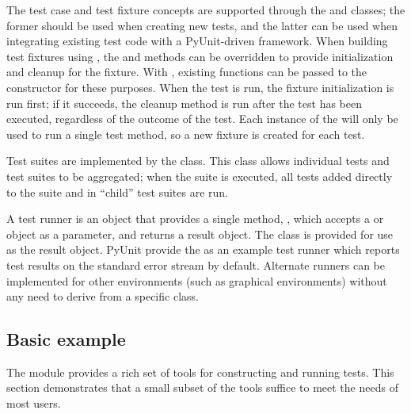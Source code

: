 The test case and test fixture concepts are supported through the
 and  classes; the former
should be used when creating new tests, and the latter can be used when
integrating existing test code with a PyUnit-driven framework.  When
building test fixtures using , the 
and  methods can be overridden to provide
initialization and cleanup for the fixture.  With
, existing functions can be passed to the
constructor for these purposes.  When the test is run, the
fixture initialization is run first; if it succeeds, the cleanup
method is run after the test has been executed, regardless of the
outcome of the test.  Each instance of the  will only
be used to run a single test method, so a new fixture is created for
each test.

Test suites are implemented by the  class.  This
class allows individual tests and test suites to be aggregated; when
the suite is executed, all tests added directly to the suite and in
``child'' test suites are run.

A test runner is an object that provides a single method,
, which accepts a  or 
object as a parameter, and returns a result object.  The class
 is provided for use as the result object.  PyUnit
provide the  as an example test runner which
reports test results on the standard error stream by default.
Alternate runners can be implemented for other environments (such as
graphical environments) without any need to derive from a specific
class.


\begin{seealso}
\end{seealso}


\subsection{Basic example \label{minimal-example}}

The  module provides a rich set of tools for
constructing and running tests.  This section demonstrates that a
small subset of the tools suffice to meet the needs of most users.

